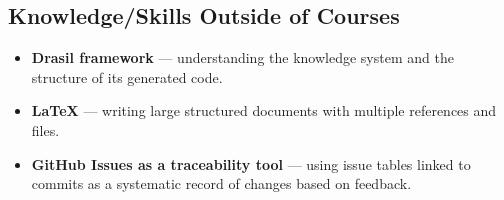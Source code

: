 \documentclass{article}
\begin{document}
\subsection{Knowledge/Skills Outside of Courses}

\begin{itemize}
  \item \textbf{Drasil framework} ---
        understanding the knowledge system and the structure of
        its generated code.
  \item \textbf{LaTeX} ---
        writing large structured documents with multiple references and
        files.
  \item \textbf{GitHub Issues as a traceability tool} ---
        using issue tables linked to commits as a systematic record of
        changes based on feedback.
\end{itemize}
\end{document}
